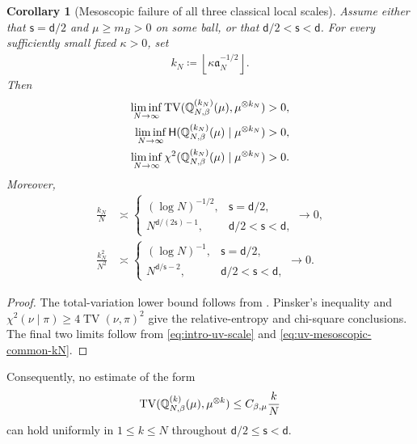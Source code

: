 \documentclass[11pt,reqno]{amsart}
\numberwithin{equation}{section}
\theoremstyle{plain}
\newtheorem{cor}[cor]{Corollary}
\theoremstyle{remark}
\DeclarePairedDelimiter{\pa}{\lparen}{\rparen}
\renewcommand{\d}{\mathsf{d}}
\newcommand{\Q}{{\mathbb{Q}}}
\newcommand{\Hr}{{\mathsf{H}}}
\newcommand{\be}{\beta}
\newcommand{\s}{\mathsf{s}}
\newcommand{\Chi}{\chi^2}
\newcommand{\TV}{\operatorname{TV}}
\begin{document}
\begin{cor}[Mesoscopic failure of all three classical local scales]
\label{cor:uv-mesoscopic-all-divergences}
Assume either that \(\s=\d/2\) and \(\mu\ge m_B>0\) on some ball, or that \(\d/2<\s<\d\).  For every sufficiently small fixed \(\kappa>0\), set
\begin{align}\label{eq:uv-mesoscopic-common-kN}
 k_N\coloneqq\left\lfloor\kappa\mathfrak a_N^{-1/2}\right\rfloor.
\end{align}
Then
\begin{align}
 \liminf_{N\to\infty}
 \TV\pa{\Q_{N,\be}^{(k_N)}(\mu),\mu^{\otimes k_N}}&>0,
 \label{eq:uv-mesoscopic-TV-liminf}\\
 \liminf_{N\to\infty}
 \Hr\pa{\Q_{N,\be}^{(k_N)}(\mu)\mid\mu^{\otimes k_N}}&>0,
 \label{eq:uv-mesoscopic-H-liminf}\\
 \liminf_{N\to\infty}
 \Chi\pa{\Q_{N,\be}^{(k_N)}(\mu)\mid\mu^{\otimes k_N}}&>0.
 \label{eq:uv-mesoscopic-chi-liminf}
\end{align}
Moreover,
\begin{align}
 \frac{k_N}{N}
 &\asymp
 \begin{cases}
 (\log N)^{-1/2},&\s=\d/2,\\
 N^{\d/(2\s)-1},&\d/2<\s<\d,
 \end{cases}
 \longrightarrow0,
 \label{eq:uv-mesoscopic-vanishing-fraction}\\
 \frac{k_N^2}{N^2}
 &\asymp
 \begin{cases}
 (\log N)^{-1},&\s=\d/2,\\
 N^{\d/\s-2},&\d/2<\s<\d,
 \end{cases}
 \longrightarrow0.
 \label{eq:uv-mesoscopic-subcritical-scale-vanishes}
\end{align}
\end{cor}

\begin{proof}
The total-variation lower bound follows from .  Pinsker's inequality and \(\Chi(\nu\mid\pi)\ge4\TV(\nu,\pi)^2\) give the relative-entropy and chi-square conclusions.  The final two limits follow from \eqref{eq:intro-uv-scale} and \eqref{eq:uv-mesoscopic-common-kN}.
\end{proof}

Consequently, no estimate of the form
\begin{align}\label{eq:uv-impossible-k-over-N-bound}
 \TV\pa{\Q_{N,\be}^{(k)}(\mu),\mu^{\otimes k}}
 \le C_{\be,\mu}\frac{k}{N}
\end{align}
can hold uniformly in \(1\le k\le N\) throughout \(\d/2\le\s<\d\).
\end{document}
